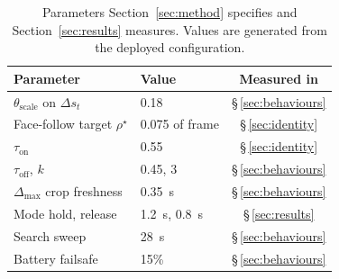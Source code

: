 \begin{table}[t]
\caption{Parameters Section~\ref{sec:method} specifies and Section~\ref{sec:results} measures. Values are generated from the deployed configuration.}
\label{tab:design}
\centering
\footnotesize
\setlength{\tabcolsep}{4pt}
\renewcommand{\arraystretch}{1.05}
\begin{tabular}{@{}llc@{}}
\toprule
Parameter & Value & Measured in \\
\midrule
$\theta_{\mathrm{scale}}$ on $\Delta s_t$ & 0.18 & \S\,\ref{sec:behaviours} \\
Face-follow target $\rho^{\star}$ & 0.075 of frame & \S\,\ref{sec:identity} \\
$\tau_{\mathrm{on}}$ & 0.55 & \S\,\ref{sec:identity} \\
$\tau_{\mathrm{off}}$, $k$ & 0.45, 3 & \S\,\ref{sec:behaviours} \\
$\Delta_{\max}$ crop freshness & 0.35~s & \S\,\ref{sec:behaviours} \\
Mode hold, release & 1.2~s, 0.8~s & \S\,\ref{sec:results} \\
Search sweep & 28~s & \S\,\ref{sec:behaviours} \\
Battery failsafe & 15\% & \S\,\ref{sec:behaviours} \\
\bottomrule
\end{tabular}
\end{table}
